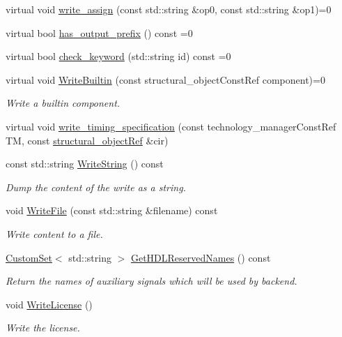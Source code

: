 \begin{DoxyCompactItemize}
virtual void \hyperlink{classlanguage__writer_a49b971e9b90296b0096a78c06219992d}{write\+\_\+assign} (const std\+::string \&op0, const std\+::string \&op1)=0
\item 
virtual bool \hyperlink{classlanguage__writer_a10d8bf3a0f71364bc3a72273c1172a34}{has\+\_\+output\+\_\+prefix} () const =0
\item 
virtual bool \hyperlink{classlanguage__writer_a5a69f96be3c6c3cab69325058c077d21}{check\+\_\+keyword} (std\+::string id) const =0
\item 
virtual void \hyperlink{classlanguage__writer_a30538fe1dc72928281e409f7684ced83}{Write\+Builtin} (const structural\+\_\+object\+Const\+Ref component)=0
\begin{DoxyCompactList}\small\item\em Write a builtin component. \end{DoxyCompactList}\item 
virtual void \hyperlink{classlanguage__writer_acbb595dd221844492946d60b79c00185}{write\+\_\+timing\+\_\+specification} (const technology\+\_\+manager\+Const\+Ref TM, const \hyperlink{structural__objects_8hpp_a8ea5f8cc50ab8f4c31e2751074ff60b2}{structural\+\_\+object\+Ref} \&cir)
\item 
const std\+::string \hyperlink{classlanguage__writer_a12e31915cd8caac0dfaf0bd5737a7a41}{Write\+String} () const
\begin{DoxyCompactList}\small\item\em Dump the content of the write as a string. \end{DoxyCompactList}\item 
void \hyperlink{classlanguage__writer_a2450f989cdb4b70610d544931d0add9e}{Write\+File} (const std\+::string \&filename) const
\begin{DoxyCompactList}\small\item\em Write content to a file. \end{DoxyCompactList}\item 
\hyperlink{custom__set_8hpp_a615bc2f42fc38a4bb1790d12c759e86f}{Custom\+Set}$<$ std\+::string $>$ \hyperlink{classlanguage__writer_a814d52423ed277edd092423a51a40a69}{Get\+H\+D\+L\+Reserved\+Names} () const
\begin{DoxyCompactList}\small\item\em Return the names of auxiliary signals which will be used by backend. \end{DoxyCompactList}\item 
void \hyperlink{classlanguage__writer_a8fa5e9dadb7566ee668c16555a13157a}{Write\+License} ()
\begin{DoxyCompactList}\small\item\em Write the license. \end{DoxyCompactList}\end{DoxyCompactItemize}
